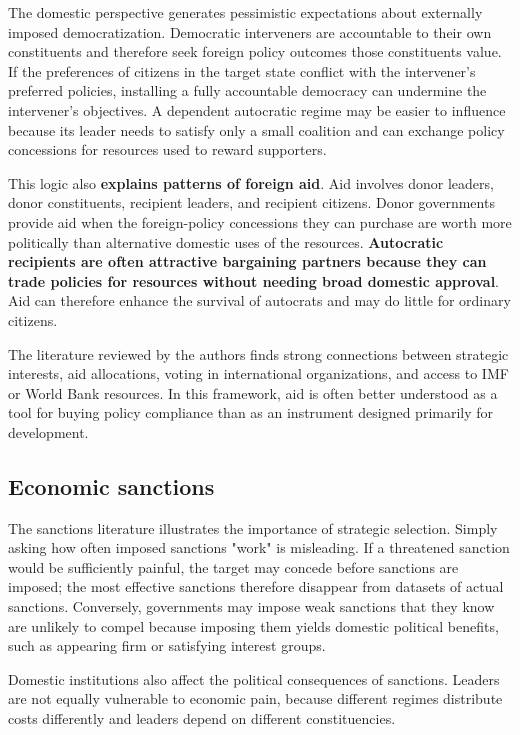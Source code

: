 The domestic perspective generates pessimistic expectations about externally imposed democratization. Democratic interveners are accountable to their own constituents and therefore seek foreign policy outcomes those constituents value. If the preferences of citizens in the target state conflict with the intervener's preferred policies, installing a fully accountable democracy can undermine the intervener's objectives. A dependent autocratic regime may be easier to influence because its leader needs to satisfy only a small coalition and can exchange policy concessions for resources used to reward supporters.

This logic also \textbf{explains patterns of foreign aid}. Aid involves donor leaders, donor constituents, recipient leaders, and recipient citizens. Donor governments provide aid when the foreign-policy concessions they can purchase are worth more politically than alternative domestic uses of the resources. \textbf{Autocratic recipients are often attractive bargaining partners because they can trade policies for resources without needing broad domestic approval}. Aid can therefore enhance the survival of autocrats and may do little for ordinary citizens.

The literature reviewed by the authors finds strong connections between strategic interests, aid allocations, voting in international organizations, and access to IMF or World Bank resources. In this framework, aid is often better understood as a tool for buying policy compliance than as an instrument designed primarily for development.

\subsection{Economic sanctions}

The sanctions literature illustrates the importance of strategic selection. Simply asking how often imposed sanctions "work" is misleading. If a threatened sanction would be sufficiently painful, the target may concede before sanctions are imposed; the most effective sanctions therefore disappear from datasets of actual sanctions. Conversely, governments may impose weak sanctions that they know are unlikely to compel because imposing them yields domestic political benefits, such as appearing firm or satisfying interest groups.

Domestic institutions also affect the political consequences of sanctions. Leaders are not equally vulnerable to economic pain, because different regimes distribute costs differently and leaders depend on different constituencies.

